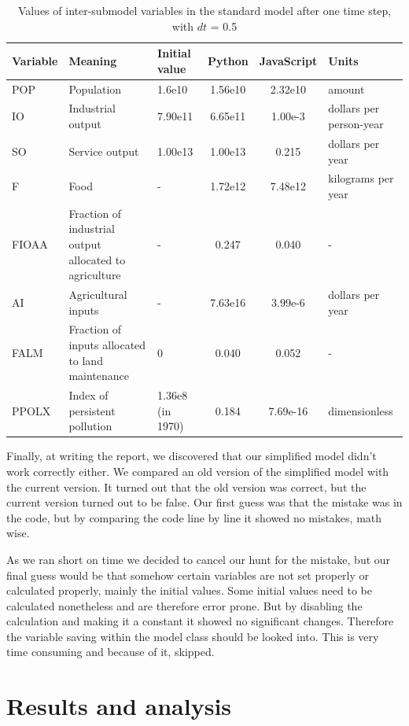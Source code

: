 \documentclass[10pt,a4paper]{scrartcl}
\begin{document}
\begin{table}
\centering
\begin{longtable}{|m{1.3cm}|m{3cm}|m{1.2cm}|c|c|m{2cm}|}
\hline
\textbf{Variable} & \textbf{Meaning} & \textbf{Initial value} & \textbf{Python} & \textbf{JavaScript} & \textbf{Units}\\
\hline
POP & Population & 1.6e10 & 1.56e10 & 2.32e10 & amount\\
\hline
IO & Industrial output & 7.90e11 & 6.65e11 & 1.00e-3 & dollars per person-year\\
\hline
SO & Service output & 1.00e13 & 1.00e13 & 0.215 & dollars per year\\
\hline
F & Food & - & 1.72e12 & 7.48e12 & kilograms per year\\
\hline
FIOAA & Fraction of industrial output allocated to agriculture & - & 0.247 & 0.040 & -\\
\hline
AI & Agricultural inputs & - & 7.63e16 & 3.99e-6 & dollars per year\\
\hline
FALM & Fraction of inputs allocated to land maintenance & 0 & 0.040 & 0.052 & -\\
\hline
PPOLX & Index of persistent pollution & 1.36e8 (in 1970) & 0.184 & 7.69e-16 & dimensionless\\
\hline
\end{longtable}
\caption{Values of inter-submodel variables in the standard model after one time step, with $dt$ = 0.5}
\label{value-differences}
\end{table}

Finally, at writing the report, we discovered that our simplified model didn't work correctly either. We compared an old version of the simplified model with the current version. It turned out that the old version was correct, but the current version turned out to be false. Our first guess was that the mistake was in the code, but by comparing the code line by line it showed no mistakes, math wise.

As we ran short on time we decided to cancel our hunt for the mistake, but our final guess would be that somehow certain variables are not set properly or calculated properly, mainly the initial values. Some initial values need to be calculated nonetheless and are therefore error prone. But by disabling the calculation and making it a constant it showed no significant changes. Therefore the variable saving within the model class should be looked into. This is very time consuming and because of it, skipped.

\section*{Results and analysis}
\end{document}
